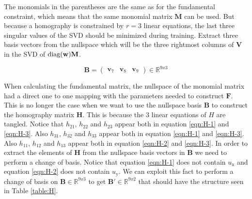 The monomials in the parentheses are the same as for the fundamental constraint, which means that the same monomial matrix $\textbf{M}$ can be used. But because a homography is constrained by $r=3$ linear equations, the last three singular values of the SVD should be minimized during training. Extract three basis vectors from the nullspace which will be the three rightmost columns of $\textbf{V}$ in the SVD of $\operatorname{diag}(\textbf{w})\textbf{M}$.

\begin{equation}
\mathbf{B} = 
\begin{pmatrix}
\textbf{v}_7 & \textbf{v}_8 & \textbf{v}_9
\end{pmatrix}
\in \mathbb{R}^{9x3}
\end{equation}

When calculating the fundamental matrix, the nullspace of the monomial matrix had a direct one to one mapping with the parameters needed to construct $\textbf{F}$. This is no longer the case when we want to use the nullspace basis $\textbf{B}$ to construct the homography matrix $\textbf{H}$. This is because the 3 linear equations of $H$ are tangled. Notice that $h_{21}$, $h_{22}$ and $h_{23}$ appear both in equation \ref{eqn:H-1} and \ref{eqn:H-3}. Also $h_{31}$, $h_{32}$ and $h_{33}$ appear both in equation \ref{eqn:H-1} and \ref{eqn:H-3}. Also $h_{11}$, $h_{12}$ and $h_{13}$ appear both in equation \ref{eqn:H-2} and \ref{eqn:H-3}. In order to extract the elements of $\textbf{H}$ from the nullspace basis vectors in $\textbf{B}$ we need to perform a change of basis.
Notice that equation \ref{eqn:H-1} does not contain $u_\mathrm{x}$ and equation \ref{eqn:H-2} does not contain $u_\mathrm{y}$. We can exploit this fact to perform a change of basis on $\textbf{B} \in \mathbb{R}^{9x3}$ to get $\textbf{B}' \in \mathbb{R}^{9x2}$ that should have the structure seen in Table \ref{table:H}.

